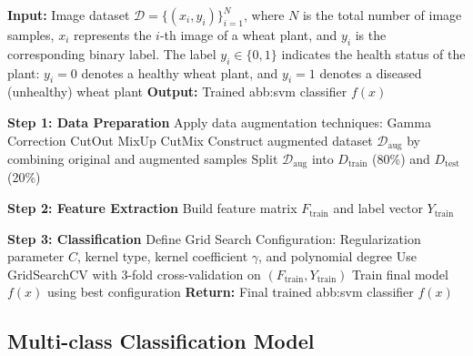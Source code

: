 \begin{algorithm}[H]
\caption{Binary Classification Model (M1)}
\textbf{Input:} Image dataset $\mathcal{D} = \{(x_i, y_i)\}_{i=1}^{N}$, where $N$ is the total number of image samples, $x_i$ represents the $i$-th image of a wheat plant, and $y_i$ is the corresponding binary label. The label $y_i \in \{0, 1\}$ indicates the health status of the plant: $y_i = 0$ denotes a healthy wheat plant, and $y_i = 1$ denotes a diseased (unhealthy) wheat plant\;
\textbf{Output:} Trained \gls{abb:svm} classifier $f(x)$\;

\vspace{2mm}
\textbf{Step 1: Data Preparation}\;
Apply data augmentation techniques:\;
\Indp
Gamma Correction\;
CutOut\;
MixUp\;
CutMix\;
\Indm
Construct augmented dataset $\mathcal{D}_{\text{aug}}$ by combining original and augmented samples\;
Split $\mathcal{D}_{\text{aug}}$ into $D_{\text{train}}$ (80\%) and $D_{\text{test}}$ (20\%)\;

\vspace{2mm}
\textbf{Step 2: Feature Extraction}\;
Build feature matrix $F_{\text{train}}$ and label vector $Y_{\text{train}}$\;

\vspace{2mm}
\textbf{Step 3: Classification}\;
Define Grid Search Configuration:\;
\Indp
Regularization parameter $C$, kernel type, kernel coefficient $\gamma$, and polynomial degree\;
\Indm
Use GridSearchCV with 3-fold cross-validation on $(F_{\text{train}}, Y_{\text{train}})$\;
Train final model $f(x)$ using best configuration\;
\vspace{1mm}
\textbf{Return:} Final trained \gls{abb:svm} classifier $f(x)$\;
\end{algorithm}











\subsection{Multi-class Classification Model}

